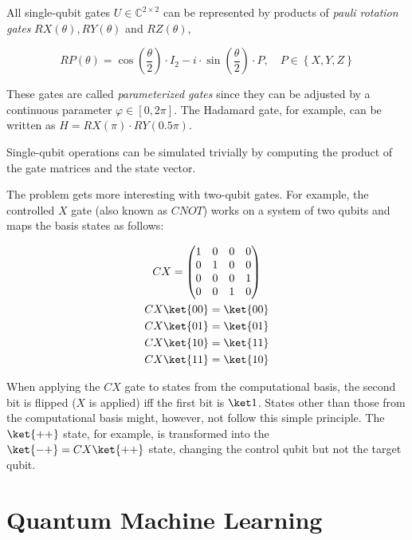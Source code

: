 All single-qubit gates $U \in \mathbb{C}^{2 \times 2}$ can be represented by
products of \emph{pauli rotation gates} $RX(\theta), RY(\theta)$ and
$RZ(\theta)$,

\begin{equation}
    \label{eq:rotational-pauli-gates}
    RP\left(\theta\right) = \cos\left(\frac\theta2\right) \cdot I_2 - i \cdot \sin\left(\frac\theta2\right) \cdot P,\quad
    P \in \left\{X, Y, Z\right\}
\end{equation}

These gates are called \emph{parameterized gates} since they can be adjusted by a
continuous parameter $\varphi \in \left[0, 2\pi\right]$.
The Hadamard gate, for example, can be written as
$H = RX(\pi) \cdot RY(0.5\pi)$.

Single-qubit operations can be simulated trivially by computing the product of
the gate matrices and the state vector.

The problem gets more interesting with two-qubit gates.
For example, the controlled $X$ gate (also known as $CNOT$) works on a system
of two qubits and maps the basis states as follows:

\begin{gather}
    \label{eq:cx-zbasis}
    CX = \begin{pmatrix}
        1&0&0&0\\
        0&1&0&0\\
        0&0&0&1\\
        0&0&1&0
    \end{pmatrix}\\
    CX \ket{00} = \ket{00}\\
    CX \ket{01} = \ket{01}\\
    CX \ket{10} = \ket{11}\\
    CX \ket{11} = \ket{10}
\end{gather}

When applying the $CX$ gate to states from the computational basis, the second
bit is flipped ($X$ is applied) iff the first bit is $\ket 1$.
States other than those from the computational basis might, however, not follow
this simple principle.
The $\ket{++}$ state, for example, is transformed into the
$\ket{-+} = CX \ket{++}$ state, changing the control qubit but not the target
qubit.


\section{Quantum Machine Learning}
\label{sec:qml-intro}

